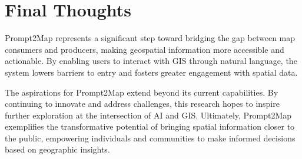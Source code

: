 \section{Final Thoughts}

Prompt2Map represents a significant step toward bridging the gap between map consumers and producers, making geospatial information more accessible and actionable. By enabling users to interact with GIS through natural language, the system lowers barriers to entry and fosters greater engagement with spatial data.

The aspirations for Prompt2Map extend beyond its current capabilities. By continuing to innovate and address challenges, this research hopes to inspire further exploration at the intersection of AI and GIS. Ultimately, Prompt2Map exemplifies the transformative potential of bringing spatial information closer to the public, empowering individuals and communities to make informed decisions based on geographic insights.